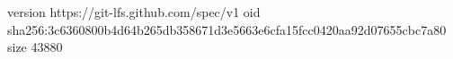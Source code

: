 version https://git-lfs.github.com/spec/v1
oid sha256:3c6360800b4d64b265db358671d3e5663e6cfa15fcc0420aa92d07655cbc7a80
size 43880
